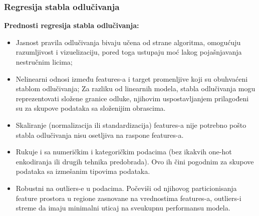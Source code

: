 \documentclass[fontsize=12bp, paper=a4]{scrarticle}
\begin{document}
\subsubsection{Regresija stabla odlučivanja}
\textbf{Prednosti regresija stabla odlučivanja:\cite{dtreeplusminus}} 
\begin{itemize}
    \item Jasnost pravila odlučivanja bivaju učena od strane algoritma, omogućuju razumljivost i vizuelizaciju, pored toga ustupaju moć lakog pojašnjavanja nestručnim licima;
    \item Nelinearni odnosi između features-a i target promenljive koji su obuhvaćeni stablom odlučivanja; Za razliku od linearnih modela, stabla odlučivanja mogu reprezentovati složene granice odluke, njihovim uspostavljanjem prilagođeni su za skupove podataka sa složenijim obrascima.
    \item Skaliranje (normalizacija ili standardizacija) features-a nije potrebno pošto stabla odlučivanja nisu osetljiva na raspone features-a.
    \item Rukuje i sa numeričkim i kategoričkim podacima (bez ikakvih one-hot enkodiranja ili drugih tehnika predobrada). Ovo ih čini pogodnim za skupove podataka sa izmešanim tipovima podataka.
    \item Robustni na outliers-e u podacima. Počeviši od njihovog particionisanja feature prostora u regione zasnovane na vrednostima features-a, outliers-i streme da imaju minimalni uticaj na sveukupnu performansu modela.
\end{itemize}
\end{document}
